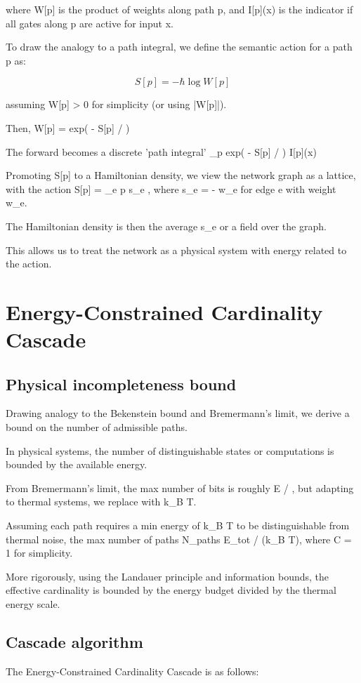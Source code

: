 \documentclass[11pt]{article}
\newcommand{\calH}{\mathcal{H}}
\begin{document}
where W[p] is the product of weights along path p, and I[p](x) is the indicator if all gates along p are active for input x.

To draw the analogy to a path integral, we define the semantic action for a path p as:

\[ S[p] = - \hbar \log W[p] \]

assuming W[p] > 0 for simplicity (or using |W[p]|).

Then, W[p] = exp( - S[p] / \hbar )

The forward becomes a discrete 'path integral' \sum_p exp( - S[p] / \hbar ) \cdot I[p](x)

Promoting S[p] to a Hamiltonian density, we view the network graph as a lattice, with the action S[p] = \sum_{e \in p} s_e , where s_e = - \hbar \log w_e for edge e with weight w_e.

The Hamiltonian density \calH is then the average s_e or a field over the graph.

This allows us to treat the network as a physical system with energy related to the action.

\section{Energy-Constrained Cardinality Cascade}
\subsection{Physical incompleteness bound}
Drawing analogy to the Bekenstein bound and Bremermann's limit, we derive a bound on the number of admissible paths.

In physical systems, the number of distinguishable states or computations is bounded by the available energy.

From Bremermann's limit, the max number of bits is roughly E / \hbar, but adapting to thermal systems, we replace \hbar with k_B T.

Assuming each path requires a min energy of k_B T to be distinguishable from thermal noise, the max number of paths N_paths \le E_tot / (k_B T), where C = 1 for simplicity.

More rigorously, using the Landauer principle and information bounds, the effective cardinality is bounded by the energy budget divided by the thermal energy scale.

\subsection{Cascade algorithm}
The Energy-Constrained Cardinality Cascade is as follows:
\end{document}
